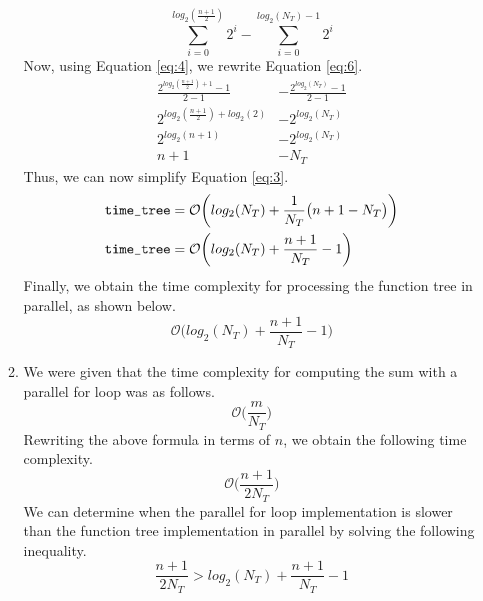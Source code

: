 \documentclass[11pt]{article}
\begin{document}
\begin{enumerate}[leftmargin=0.9in]
\begin{enumerate}[leftmargin=0.3in]
           \begin{equation} \label{eq:6}
               \sum_{i = 0}^{log_2(\frac{n + 1}{2})} 2^i - \sum_{i = 0}^{log_2(N_T) - 1} 2^i 
           \end{equation}
           Now, using Equation \ref{eq:4}, we rewrite Equation \ref{eq:6}.
           \begin{align*}
               \frac{2^{log_2(\frac{n + 1}{2}) + 1} - 1}{2 - 1} &- \frac{2^{log_2(N_T)} - 1}{2 - 1} \\
               2^{log_2(\frac{n + 1}{2}) + log_2(2)} &- 2^{log_2(N_T)} \\
               2^{log_2(n + 1)} &- 2^{log_2(N_T)} \\
               n + 1 &- N_T 
           \end{align*}
           Thus, we can now simplify Equation \ref{eq:3}.
           \begin{align*}
               \text{{\fontfamily{cmtt}\selectfont time\_tree}} &= \mathcal{O}\bigg(log_2(N_T) + \frac{1}{N_T}\big(n + 1 - N_T \big) \bigg) \\
               \text{{\fontfamily{cmtt}\selectfont time\_tree}} &= \mathcal{O}\bigg(log_2(N_T) + \frac{n + 1}{N_T} - 1 \bigg)
           \end{align*}
           Finally, we obtain the time complexity for processing the function tree in parallel, as shown below.
           \begin{equation} \label{eq:7}
               \mathcal{O}\bigg(log_2(N_T) + \frac{n + 1}{N_T} - 1 \bigg)
           \end{equation}
       \item
           We were given that the time complexity for computing the sum with a parallel for loop was as follows.
           \begin{equation*}
               \mathcal{O}\bigg( \frac{m}{N_T} \bigg)
           \end{equation*}
           Rewriting the above formula in terms of $n$, we obtain the following time complexity.
           \begin{equation} \label{eq:8}
               \mathcal{O}\bigg( \frac{n + 1}{2N_T} \bigg)
           \end{equation}
           We can determine when the parallel for loop implementation is slower than the function tree implementation in parallel by solving the following inequality.
           \begin{equation} \label{eq:9}
               \frac{n + 1}{2N_T} > log_2(N_T) + \frac{n + 1}{N_T} - 1

\end{equation}
\end{enumerate}
\end{enumerate}
\end{document}
